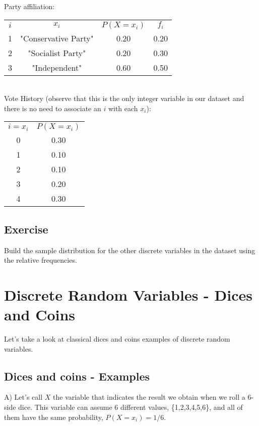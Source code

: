 \documentclass[11pt]{article}
\begin{document}
Party affiliation:

\begin{tabular}{|c|c|c|c|}
\hline
	$i$ & $x_i$ & $P(X=x_i)$ & $f_i$\\
	\cline{1-4}
	1 & "Conservative Party" & 0.20 & 0.20\\
	2 & "Socialist Party" & 0.20 & 0.30\\
	3 & "Independent" & 0.60 & 0.50\\
\hline
\end{tabular}\newline\\

Vote History (observe that this is the only integer variable in our dataset and there is no need to associate an $i$ with each $x_i$):

	\begin{tabular}{|c|c|}
\hline
	$i = x_i$ & $P(X=x_i)$\\
	\cline{1-2}
	0 & 0.30\\
	1 & 0.10\\
	2 & 0.10\\
	3 & 0.20\\
	4 & 0.30\\
\hline
\end{tabular}


\subsection*{Exercise}

Build the sample distribution for the other discrete variables in the dataset using the relative frequencies.

\section*{Discrete Random Variables - Dices and Coins}

	Let's take a look at classical dices and coins examples of discrete random variables.

	\subsection*{Dices and coins - Examples}
		
	A) Let's call $X$ the variable that indicates the result we obtain when we roll a 6-side dice. This variable can assume 6 different values, \{1,2,3,4,5,6\}, and all of them have the same probability, $P(X=x_i) = 1/6$.\\
	
\end{document}

